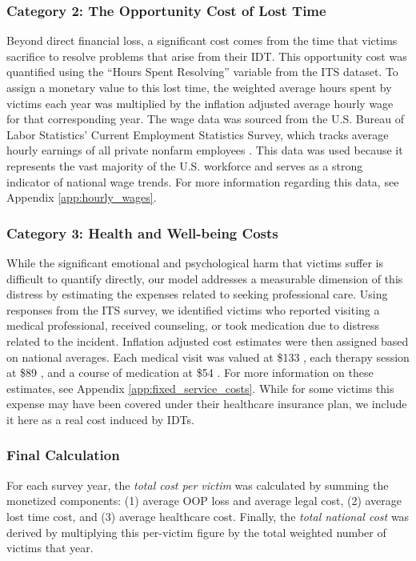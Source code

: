 \subsubsection{Category 2: The Opportunity Cost of Lost Time}
Beyond direct financial loss, a significant cost comes from the time that victims sacrifice to resolve problems that arise from their IDT. This opportunity cost was quantified using the ``Hours Spent Resolving'' variable from the ITS dataset. To assign a monetary value to this lost time, the weighted average hours spent by victims each year was multiplied by the inflation adjusted average hourly wage for that corresponding year. The wage data was sourced from the U.S. Bureau of Labor Statistics' Current Employment Statistics Survey, which tracks average hourly earnings of all private nonfarm employees \cite{FRED_Wage}. This data was used because it represents the vast majority of the U.S. workforce and serves as a strong indicator of national wage trends. For more information regarding this data, see Appendix \ref{app:hourly_wages}.

\subsubsection{Category 3: Health and Well-being Costs}
While the significant emotional and psychological harm that victims suffer is difficult to quantify directly, our model addresses a measurable dimension of this distress by estimating the expenses related to seeking professional care. %
Using responses from the ITS survey, we identified victims who reported visiting a medical professional, received counseling, or took medication due to distress related to the incident. Inflation adjusted cost estimates were then assigned based on national averages. Each medical visit was valued at \$133 \cite{DebtOrg_Doctor}, each therapy session at \$89 \cite{GoodRx_Therapy}, and a course of medication at \$54 \cite{CBO_Prescription}. For more information on these estimates, see Appendix \ref{app:fixed_service_costs}. While for some victims this expense may have been covered under their healthcare insurance plan, we include it here as a real cost induced by IDTs.

\subsubsection{Final Calculation}
For each survey year, the {\em total cost per victim} was calculated by summing the monetized components: (1) average OOP loss and average legal cost, (2) average lost time cost, and (3) average healthcare cost. Finally, the {\em total national cost} was derived by multiplying this per-victim figure by the total weighted number of victims that year. 

